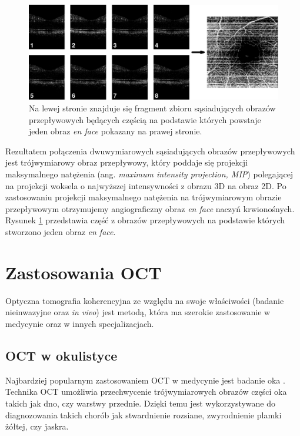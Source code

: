 \begin{figure}[H]
	\centering
	\includegraphics[width=\textwidth]{gfx/en_face_sv}
	\caption{Na lewej stronie znajduje się fragment zbioru sąsiadujących obrazów przepływowych będących częścią na podstawie których powstaje jeden obraz \textit{en face} pokazany na prawej stronie.}
	\label{fig:obrazowanie_oct:en_face_sv}
\end{figure}

Rezultatem połączenia dwuwymiarowych sąsiadujących obrazów przepływowych jest trójwymiarowy obraz przepływowy, który poddaje się projekcji maksymalnego natężenia (ang. \textit{maximum intensity projection, MIP}) polegającej na projekcji woksela o najwyższej intensywności z obrazu 3D na obraz 2D. Po zastosowaniu projekcji maksymalnego natężenia na trójwymiarowym obrazie przepływowym otrzymujemy angiograficzny obraz \textit{en face} naczyń krwionośnych. Rysunek \ref{fig:obrazowanie_oct:en_face_sv} przedstawia część z obrazów przepływowych na podstawie których stworzono jeden obraz \textit{en face}.


\section{Zastosowania OCT}
\label{sec:obrazowanie_oct:zastosowania_oct}

Optyczna tomografia koherencyjna ze względu na swoje właściwości (badanie nieinwazyjne oraz \textit{in vivo}) jest metodą, która ma szerokie zastosowanie w medycynie oraz w innych specjalizacjach.

\subsection{OCT w okulistyce}

Najbardziej popularnym zastosowaniem OCT w medycynie jest badanie oka \cite{Fercher03}. Technika OCT umożliwia przechwycenie trójwymiarowych obrazów części oka takich jak dno, czy warstwy przednie. Dzięki temu jest wykorzystywane do diagnozowania takich chorób jak stwardnienie rozsiane, zwyrodnienie plamki żółtej, czy jaskra.

